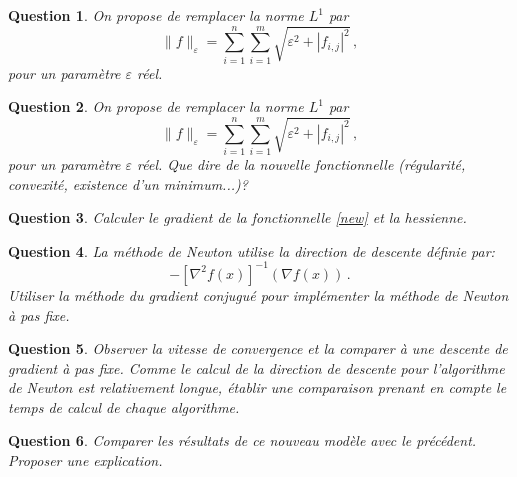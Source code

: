 \documentclass[10pt,a4paper,fleqn]{report}
\newtheorem{question}{Question}
\begin{document}
\begin{question}
On propose de remplacer la norme $L^1$ par 
\begin{equation}\label{new}
\| f \|_{\varepsilon} = \sum_{i=1}^n \sum_{i=1}^m \sqrt{\varepsilon^2 + |f_{i,j}|^2} \,,
\end{equation}
pour un param\`etre $\varepsilon$ r\'eel.
\end{question}

\begin{question}
On propose de remplacer la norme $L^1$ par 
\begin{equation}
\| f \|_{\varepsilon} = \sum_{i=1}^n \sum_{i=1}^m \sqrt{\varepsilon^2 + |f_{i,j}|^2} \,,
\end{equation}
pour un param\`etre $\varepsilon$ r\'eel.
Que dire de la nouvelle fonctionnelle (r\'egularit\'e, convexit\'e, existence d'un minimum...)?
\end{question}

\begin{question}
Calculer le gradient de la fonctionnelle \eqref{new} et la hessienne.
\end{question}

\begin{question}
La m\'ethode de Newton utilise la direction de descente d\'efinie par:
$$ -[\nabla^2f(x)]^{-1}(\nabla f(x))\,.$$
Utiliser la m\'ethode du gradient conjugu\'e pour impl\'ementer la m\'ethode de Newton \`a pas fixe.
\end{question}

\begin{question}
Observer la vitesse de convergence et la comparer \`a une descente de gradient \`a pas fixe.
Comme le calcul de la direction de descente pour l'algorithme de Newton est relativement longue, \'etablir une comparaison prenant en compte le temps de calcul de chaque algorithme.
\end{question}

\begin{question}
Comparer les r\'esultats de ce nouveau mod\`ele avec le pr\'ec\'edent. Proposer une explication.
\end{question}
\end{document}
